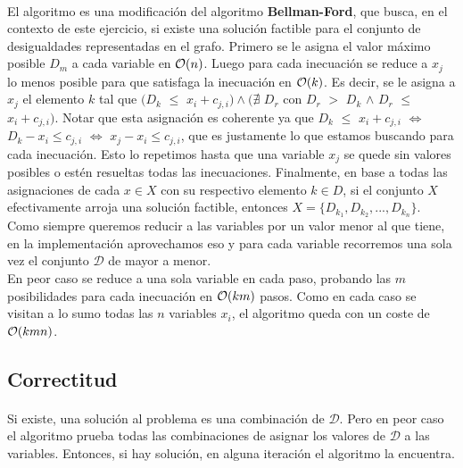 \documentclass[../main.tex]{subfiles}
\begin{document}
\paragraph{} El algoritmo es una modificación del algoritmo \textbf{Bellman-Ford}, que busca, en el contexto de este ejercicio, si existe una soluci\'on factible para el conjunto de desigualdades representadas en el grafo. Primero se le asigna el valor máximo posible \(D_{m}\) a cada variable en \(\mathcal{O}(n)\). Luego para cada inecuación se reduce a \(x_{j}\) lo menos posible para que satisfaga la inecuación en \(\mathcal{O}(k)\). Es decir, se le asigna a $x_j$ el elemento $k$ tal que $(D_k$ $\leq$ $x_i + c_{j,i}) \land (\nexists$ $D_r$ con $D_r$ $>$ $D_k$ $\land$ $D_r$ $\leq$ $x_i + c_{j,i})$. Notar que esta asignaci\'on es coherente ya que $D_k$ $\leq$ $x_i + c_{j,i}$ $\iff$ $D_k - x_i \leq c_{j,i}$ $\iff$ $x_j - x_i \leq c_{j,i}$, que es justamente lo que estamos buscando para cada inecuaci\'on. Esto lo repetimos hasta que una variable \(x_{j}\) se quede sin valores posibles o estén resueltas todas las inecuaciones. Finalmente, en base a todas las asignaciones de cada $x \in X$ con su respectivo elemento $k \in D$, si el conjunto $X$ efectivamente arroja una soluci\'on factible, entonces $X = \lbrace D_{k_1}, D_{k_2}, ..., D_{k_n} \rbrace$. \\
Como siempre queremos reducir a las variables por un valor menor al que tiene, en la implementación aprovechamos eso y para cada variable recorremos una sola vez el conjunto \(\mathcal{D}\) de mayor a menor. \\
En peor caso se reduce a una sola variable en cada paso, probando las \(m\) posibilidades para cada inecuación en \(\mathcal{O}(km)\) pasos. Como en cada caso se visitan a lo sumo todas las $n$ variables $x_i$, el algoritmo queda con un coste de \(\mathcal{O}(kmn)\). \\

\subsection{Correctitud}
\label{sec:ej4-proof}

\paragraph{} Si existe, una solución al problema es una combinación de \(\mathcal{D}\). Pero en peor caso el algoritmo prueba todas las combinaciones de asignar los valores de \(\mathcal{D}\) a las variables. Entonces, si hay solución, en alguna iteración el algoritmo la encuentra.
\end{document}

